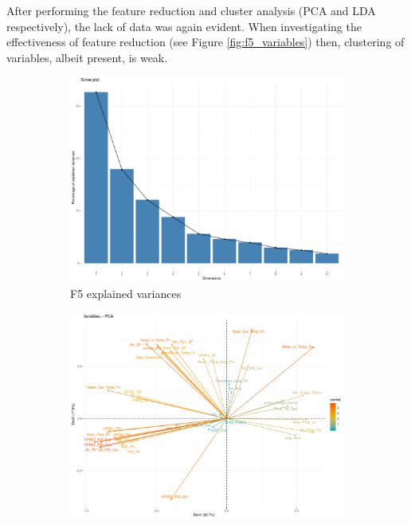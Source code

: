 After performing the feature reduction and cluster analysis (PCA and LDA respectively), the lack of data was again evident. When investigating the effectiveness of feature reduction (see Figure \ref{fig:f5_variables}) then, clustering of variables, albeit present, is weak. 

\begin{figure}[ht]
\centering
\begin{subfigure}{.3\textwidth}
    \centering
    \includegraphics[width=\textwidth]{plots/f5_explained_variances.pdf}        
    \caption{F5 explained variances}
    \label{fig:f5_explained_variances}
\end{subfigure}%
\begin{subfigure}{.3\textwidth}
    \centering
    \includegraphics[width=\textwidth]{plots/f5_graph_of_variables.pdf}

\end{subfigure}
\end{figure}

